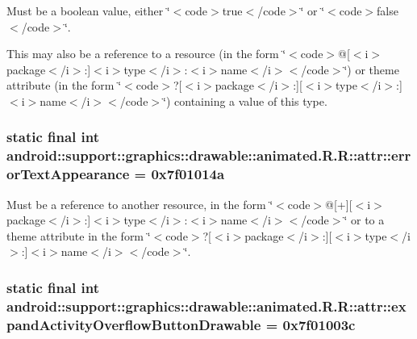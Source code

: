 Must be a boolean value, either \char`\"{}$<$code$>$true$<$/code$>$\char`\"{} or \char`\"{}$<$code$>$false$<$/code$>$\char`\"{}. 

This may also be a reference to a resource (in the form \char`\"{}$<$code$>$@\mbox{[}$<$i$>$package$<$/i$>$:\mbox{]}$<$i$>$type$<$/i$>$:$<$i$>$name$<$/i$>$$<$/code$>$\char`\"{}) or theme attribute (in the form \char`\"{}$<$code$>$?\mbox{[}$<$i$>$package$<$/i$>$:\mbox{]}\mbox{[}$<$i$>$type$<$/i$>$:\mbox{]}$<$i$>$name$<$/i$>$$<$/code$>$\char`\"{}) containing a value of this type. \hypertarget{classandroid_1_1support_1_1graphics_1_1drawable_1_1animated_1_1_r_1_1attr_e3de5aaab869e9bb143f91eb9f4d994e}{
\subsubsection[{errorTextAppearance}]{\setlength{\rightskip}{0pt plus 5cm}static final int android::support::graphics::drawable::animated.R.R::attr::errorTextAppearance = 0x7f01014a}}
\label{classandroid_1_1support_1_1graphics_1_1drawable_1_1animated_1_1_r_1_1attr_e3de5aaab869e9bb143f91eb9f4d994e}


Must be a reference to another resource, in the form \char`\"{}$<$code$>$@\mbox{[}+\mbox{]}\mbox{[}$<$i$>$package$<$/i$>$:\mbox{]}$<$i$>$type$<$/i$>$:$<$i$>$name$<$/i$>$$<$/code$>$\char`\"{} or to a theme attribute in the form \char`\"{}$<$code$>$?\mbox{[}$<$i$>$package$<$/i$>$:\mbox{]}\mbox{[}$<$i$>$type$<$/i$>$:\mbox{]}$<$i$>$name$<$/i$>$$<$/code$>$\char`\"{}. \hypertarget{classandroid_1_1support_1_1graphics_1_1drawable_1_1animated_1_1_r_1_1attr_be01875cb4e1275efb3009991baa9c60}{
\subsubsection[{expandActivityOverflowButtonDrawable}]{\setlength{\rightskip}{0pt plus 5cm}static final int android::support::graphics::drawable::animated.R.R::attr::expandActivityOverflowButtonDrawable = 0x7f01003c}}
\label{classandroid_1_1support_1_1graphics_1_1drawable_1_1animated_1_1_r_1_1attr_be01875cb4e1275efb3009991baa9c60}


